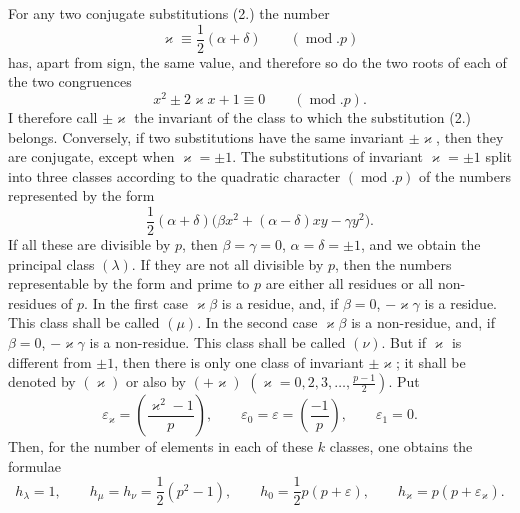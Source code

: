 \documentclass[11pt]{article}
\begin{document}
For any two conjugate substitutions (2.) the number
\begin{equation*}\tag{6.}
\varkappa\equiv \frac12(\alpha+\delta)\qquad(\operatorname{mod}.p)
\end{equation*}
has, apart from sign, the same value, and therefore so do the two roots of each of the two congruences
\begin{equation*}\tag{7.}
x^2\pm2\varkappa x+1\equiv0\qquad(\operatorname{mod}.p).
\end{equation*}
I therefore call $\pm\varkappa$ the invariant of the class to which the substitution (2.) belongs. Conversely, if two substitutions have the same invariant $\pm\varkappa$, then they are conjugate, except when $\varkappa=\pm1$. The substitutions of invariant $\varkappa=\pm1$ split into three classes according to the quadratic character $(\operatorname{mod}.p)$ of the numbers represented by the form
\begin{equation*}\tag{8.}
\frac12(\alpha+\delta)\bigl(\beta x^2+(\alpha-\delta)xy-\gamma y^2\bigr).
\end{equation*}
If all these are divisible by $p$, then $\beta=\gamma=0$, $\alpha=\delta=\pm1$, and we obtain the principal class $(\lambda)$. If they are not all divisible by $p$, then the numbers representable by the form and prime to $p$ are either all residues or all non-residues of $p$. In the first case $\varkappa\beta$ is a residue, and, if $\beta=0$, $-\varkappa\gamma$ is a residue. This class shall be called $(\mu)$. In the second case $\varkappa\beta$ is a non-residue, and, if $\beta=0$, $-\varkappa\gamma$ is a non-residue. This class shall be called $(\nu)$. But if $\varkappa$ is different from $\pm1$, then there is only one class of invariant $\pm\varkappa$; it shall be denoted by $(\varkappa)$ or also by $(+\varkappa)$ $\left(\varkappa=0,2,3,\ldots,\frac{p-1}{2}\right)$. Put
\begin{equation*}\tag{9.}
\varepsilon_\varkappa=\left(\frac{\varkappa^2-1}{p}\right),\qquad
\varepsilon_0=\varepsilon=\left(\frac{-1}{p}\right),\qquad
\varepsilon_1=0.
\end{equation*}
Then, for the number of elements in each of these $k$ classes, one obtains the formulae
\begin{equation*}\tag{10.}
h_\lambda=1,\qquad
h_\mu=h_\nu=\frac12(p^2-1),\qquad
h_0=\frac12p(p+\varepsilon),\qquad
h_\varkappa=p(p+\varepsilon_\varkappa).
\end{equation*}
\end{document}
